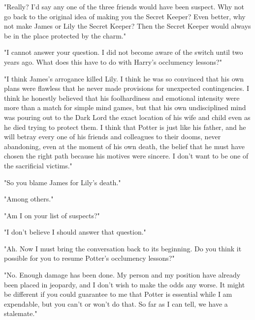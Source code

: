 \documentclass[a4paper,11pt]{article}
\begin{document}
"Really? I'd say any one of the three friends would have been suspect. Why not go back to the original idea of making you the Secret Keeper? Even better, why not make James or Lily the Secret Keeper? Then the Secret Keeper would always be in the place protected by the charm."

"I cannot answer your question. I did not become aware of the switch until two years ago. What does this have to do with Harry's occlumency lessons?"

"I think James's arrogance killed Lily. I think he was so convinced that his own plans were flawless that he never made provisions for unexpected contingencies. I think he honestly believed that his foolhardiness and emotional intensity were more than a match for simple mind games, but that his own undisciplined mind was pouring out to the Dark Lord the exact location of his wife and child even as he died trying to protect them. I think that Potter is just like his father, and he will betray every one of his friends and colleagues to their dooms, never abandoning, even at the moment of his own death, the belief that he must have chosen the right path because his motives were sincere. I don't want to be one of the sacrificial victims."

"So you blame James for Lily's death."

"Among others."

"Am I on your list of suspects?"

"I don't believe I should answer that question."

"Ah. Now I must bring the conversation back to its beginning. Do you think it possible for you to resume Potter's occlumency lessons?"

"No. Enough damage has been done. My person and my position have already been placed in jeopardy, and I don't wish to make the odds any worse. It might be different if you could guarantee to me that Potter is essential while I am expendable, but you can't or won't do that. So far as I can tell, we have a stalemate."
\end{document}
